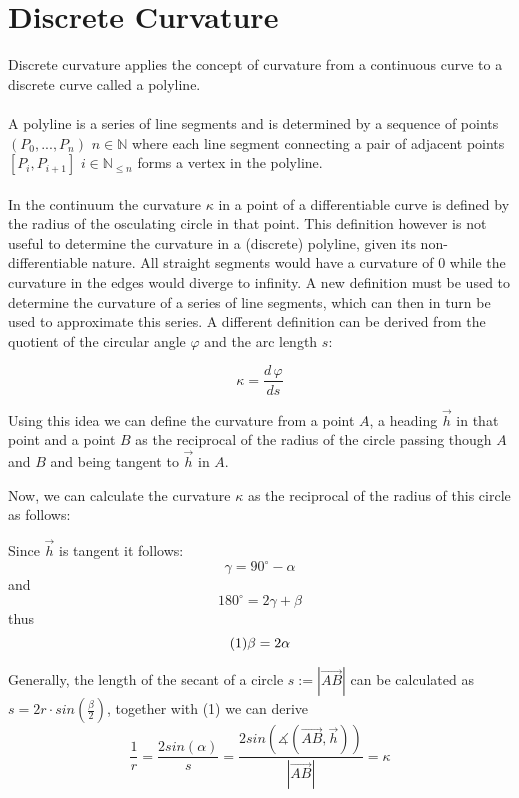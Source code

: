\section{Discrete Curvature}


Discrete curvature applies the concept of curvature from a continuous curve to a discrete curve called a polyline.\\
\\

A polyline is a series of line segments and is determined by a sequence of points $(P_0,...,P_n)$ $n \in \mathbb{N}$ where each line segment connecting a pair of adjacent points $[P_i,P_{i+1}]$ $i \in \mathbb{N}_{\le n}$ forms a vertex in the polyline.\\
\\In the continuum the curvature $\kappa$ in a point of a differentiable curve is defined by the radius of the osculating circle in that point. This definition however is not useful to determine the curvature in a (discrete) polyline, given its non-differentiable nature. All straight segments would have a curvature of $0$ while the curvature in the edges would diverge to infinity. A new definition must be used to determine the curvature of a series of line segments, which can then in turn be used to approximate this series. A different definition can be derived from the quotient of the circular angle $\varphi$ and the arc length $s$:

$$\kappa  =  {\frac{{d\,\varphi}}{{ds}}}$$

Using this idea we can define the curvature from a point $A$, a heading  $\vec h$ in that point and a point $B$ as the reciprocal of the radius of the circle passing though $A$ and $B$ and being tangent to  $\vec h$ in $A$.


Now, we can calculate the curvature $\kappa$ as the reciprocal of the radius of this circle as follows:

Since $\vec h$ is tangent it follows: $$\gamma=90^{\circ} - \alpha$$ and $$180^{\circ}=2\gamma+\beta$$ thus $$(1) \space \beta = 2 \alpha$$


Generally, the length of the secant of a circle $s:=|\vec{AB}|$ can be calculated as
$s = 2r \cdot  sin(\frac{\beta}{2})$, together with (1) we can derive
$$\frac{1}{r} = \frac{2sin(\alpha)}{s} = \frac{2sin(\measuredangle(\vec{AB},\vec h))}{|\vec{AB}|} = \kappa$$\\

